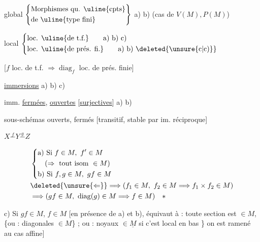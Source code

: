 global $\left\{\begin{aligned}&\text{Morphismes qu. \uline{cpts}}\\&\text{de \uline{type fini}}\end{aligned}\right\}$ a) b) (cas de $V(M),P(M)$)

local $\left\{\begin{aligned}&\text{loc. \uline{de t.f.}}\qquad\text{a) b) c)}\\&\text{loc. \uline{de prés. fi.}}\qquad\text{a) b) }\deleted{\unsure{\text{c}|\text{c)}}}\end{aligned}\right.$

[$f$  loc. de t.f. $\Rightarrow\operatorname{diag}_f$ loc. de prés. finie]

\uline{immersions} \qquad a) b) c)

imm. \uline{fermées}, \uline{ouvertes} [\uline{surjectives}] a) b)

sous-schémas ouverts, fermés [transitif, stable par im. réciproque]


$X\overset{f}{\mathrel{-}}Y\overset{g}{\mathrel{-}}Z$

\[
\begin{aligned}
 &\left\{\begin{aligned}
 &\text{a) Si } f\in M,\ f'\in M\\
 &\quad(\Rightarrow\text{ tout isom }\in M)\\
 &\text{b) Si }f,g\in M,\ gf\in M
 \end{aligned}\right.\\
 &\deleted{\unsure{\Leftarrow}}\Longrightarrow(f_1\in M,\ f_2\in M\Longrightarrow f_1\times f_2\in M)\\
 &\Longrightarrow(gf\in M,\ \operatorname{diag}(g)\in M\Longrightarrow f\in M)\quad *
\end{aligned}
\]

c) Si $gf\in M$, $f\in M$ [en présence de a) et b), équivaut à : toute section est $\in M$, \{ou : diagonales $\in M$\} ; ou : noyaux $\in\underline{M}$ si c'est local en bas  \} on est ramené au cas affine]


